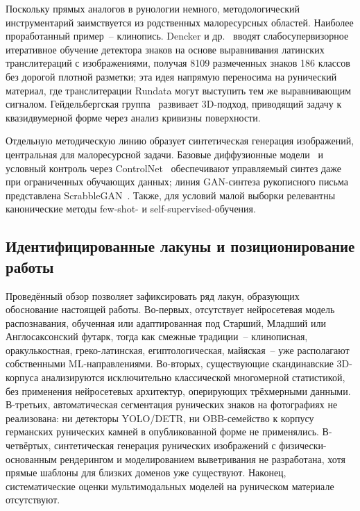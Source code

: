 \documentclass[a4paper,12pt]{extarticle}
\begin{document}
Поскольку прямых аналогов в рунологии немного, методологический инструментарий заимствуется из родственных малоресурсных областей. Наиболее проработанный пример~-- клинопись. Dencker и др.~\cite{dencker2020} вводят слабосупервизорное итеративное обучение детектора знаков на основе выравнивания латинских транслитераций с изображениями, получая 8109 размеченных знаков 186 классов без дорогой плотной разметки; эта идея напрямую переносима на рунический материал, где транслитерации Rundata могут выступить тем же выравнивающим сигналом. Гейдельбергская группа~\cite{bogacz2022} развивает 3D-подход, приводящий задачу к квазидвумерной форме через анализ кривизны поверхности.

Отдельную методическую линию образует синтетическая генерация изображений, центральная для малоресурсной задачи. Базовые диффузионные модели~\cite{rombach2022ldm} и условный контроль через ControlNet~\cite{zhang2023controlnet} обеспечивают управляемый синтез даже при ограниченных обучающих данных; линия GAN-синтеза рукописного письма представлена ScrabbleGAN~\cite{fogel2020scrabblegan}. Также, для условий малой выборки релевантны канонические методы few-shot- и self-supervised-обучения.

\subsection{Идентифицированные лакуны и позиционирование работы}
\label{sec:lit-gaps}

Проведённый обзор позволяет зафиксировать ряд лакун, образующих обоснование настоящей работы. Во-первых, отсутствует нейросетевая модель распознавания, обученная или адаптированная под Старший, Младший или Англосаксонский футарк, тогда как смежные традиции~-- клинописная, оракулькостная, греко-латинская, египтологическая, майяская~-- уже располагают собственными ML-направлениями. Во-вторых, существующие скандинавские 3D-корпуса анализируются исключительно классической многомерной статистикой, без применения нейросетевых архитектур, оперирующих трёхмерными данными. В-третьих, автоматическая сегментация рунических знаков на фотографиях не реализована: ни детекторы YOLO/DETR, ни OBB-семейство к корпусу германских рунических камней в опубликованной форме не применялись. В-четвёртых, синтетическая генерация рунических изображений с физически-основанным рендерингом и моделированием выветривания не разработана, хотя прямые шаблоны для близких доменов уже существуют. Наконец, систематические оценки мультимодальных моделей на руническом материале отсутствуют.
\end{document}
